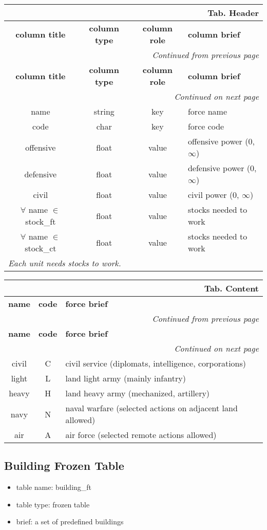 \documentclass[a4paper,oneside,titlepage]{report}
\newcommand*{\LTHeaderIII}[4]{
  \multicolumn{3}{r}{\textbf{Tab. \thesubsection} \textbf{#1}}\\    
  \hline
  \textbf{#2} & \textbf{#3} & \textbf{#4}\\
  \hline

  \endfirsthead
  \multicolumn{3}{r}{\textit{Continued from previous page}}\\    
  \hline
  \textbf{#2} & \textbf{#3} & \textbf{#4}\\
  \hline
  \endhead
  \hline
  \multicolumn{3}{r}{\textit{Continued on next page}}\\
  \endfoot
  \hline
  \endlastfoot  
}
\newcommand*{\LTHeaderIV}[5]{
  \multicolumn{4}{r}{\textbf{Tab. \thesubsection} \textbf{#1}}\\    
  \hline
  \textbf{#2} & \textbf{#3} & \textbf{#4} & \textbf{#5}\\
  \hline
  
  \endfirsthead
  \multicolumn{4}{r}{\textit{Continued from previous page}}\\    
  \hline
  \textbf{#2} & \textbf{#3} & \textbf{#4} & \textbf{#5}\\
  \hline
  \endhead
  \hline
  \multicolumn{4}{r}{\textit{Continued on next page}}\\
  \endfoot
  \hline
  \endlastfoot  
}
\begin{document}
\vspace{-0.5cm}
\begin{longtable}{ |c|c|c|l| } 
  \LTHeaderIV{Header}{column title}{column type}{column role}{column brief}
  name & string & key & force name\\
  code & char & key & force code\\
  offensive & float & value & offensive power (0, $\infty$)\\
  defensive & float & value & defensive power (0, $\infty$)\\
  civil & float & value & civil power (0, $\infty$)\\
  $\forall$ name $\in$ stock\_ft & float & value & stocks needed to work\\
  $\forall$ name $\in$ stock\_ct & float & value & stocks needed to work\\
  \multicolumn{4}{|l|}{\textit{Each unit needs stocks to work.}}\\  
\end{longtable}        

\vspace{-0.5cm}
\begin{longtable}{ |c|c|l| }    
  \LTHeaderIII{Content}{name}{code}{force brief}                    
  civil & C & civil service (diplomats, intelligence, corporations)\\
  light & L & land light army (mainly infantry)\\
  heavy & H & land heavy army (mechanized, artillery)\\
  navy & N & naval warfare (selected actions on adjacent land allowed)\\
  air & A & air force (selected remote actions allowed)\\
\end{longtable}

\subsection{Building Frozen Table}
\begin{itemize}
  \setlength{\itemsep}{0pt}
  \setlength{\parskip}{0pt}
\item table name: building\_ft  
\item table type: frozen table   
\item brief: a set of predefined buildings    
\end{itemize}
\end{document}
